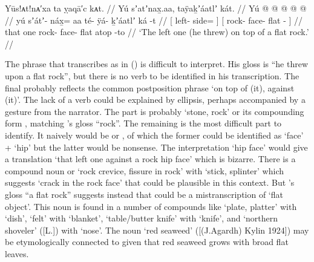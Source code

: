 
\ex\label{ex:93-63-left-one-on-rock}%
%
\begingl
	\glpreamble	Yūs!ᴀt!nᴀ′xa ta ỵaqā′c kᴀt. //
	\glpreamble	Yú sʼatʼnax̱.aa, taÿaḵʼáatlʼ kát. //
	\gla	{} Yú  @ {} @ {} {} 
		{}  @ {} @ {}  @ {} {} //
	\glb	{} yú sʼátʼ- náx̱= aa {}
		{} té- ÿá- ḵʼáatlʼ ká -t {} //
	\glc	{}[  left- side=  {}]
		{}[ rock- face- flat  - {}] //
	\gld	{} that  {} one {}
		{} rock- face- flat atop -to {} //
	\glft	‘The left one (he threw) on top of a flat rock.’
		//
\endgl
\xe

The phrase that \citeauthor{swanton:1909} transcribes as  in (\lastx) is difficult to interpret.
His gloss is “he threw upon a flat rock”, but there is no verb to be identified in his transcription.
The final  probably reflects the common postposition phrase  ‘on top of (it), against (it)’.
The lack of a verb could be explained by ellipsis, perhaps accompanied by a gesture from the narrator.
The  part is probably  ‘stone, rock’ or its compounding form , matching \citeauthor{swanton:1909}’s gloss “rock”.
The remaining  is the most difficult part to identify.
It naively would be  or , of which the former could be identified as  ‘face’ +  ‘hip’ but the latter would be nonsense.
The interpretation ‘hip face’ would give a translation ‘that left one against a rock hip face’ which is bizarre.
There is a compound noun  or  ‘rock crevice, fissure in rock’ with  ‘stick, splinter’ which suggests  ‘crack in the rock face’ that could be plausible in this context.
But \citeauthor{swanton:1909}’s gloss “a flat rock” suggests instead that  could be a mistranscription of  ‘flat object’.
This noun is found in a number of compounds like  ‘plate, platter’ with  ‘dish’,  ‘felt’ with  ‘blanket’,  ‘table/butter knife’ with  ‘knife’, and  ‘northern shoveler’ ([L.]) with  ‘nose’.
The noun  ‘red seaweed’ ([(J.Agardh) Kylin 1924]) may be etymologically connected to  given that red seaweed grows with broad flat leaves.

